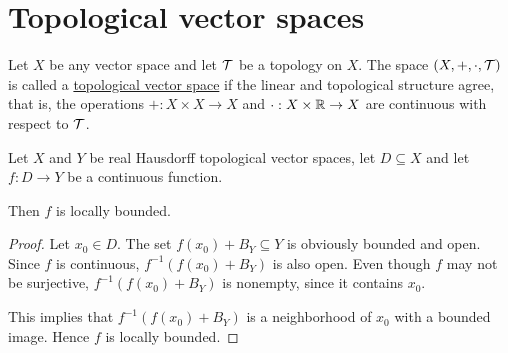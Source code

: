 \section{Topological vector spaces}\label{sec:topological_vector_spaces}

\begin{definition}\label{def:topological_vector_space}
  Let $X$ be any vector space and let $\mathcal T$ be a topology on $X$. The space $(X, +, \cdot, \mathcal T)$ is called a \ul{topological vector space} if the linear and topological structure agree, that is, the operations $+: X \times X \to X$ and $\cdot: X \times \mathbb R \to X$ are continuous with respect to $\mathcal T$.
\end{definition}

\begin{proposition}\label{thm:continuous_implies_locally_bounded}
  Let $X$ and $Y$ be real Hausdorff topological vector spaces, let $D \subseteq X$ and let $f: D \to Y$ be a continuous function.

  Then $f$ is locally bounded.
\end{proposition}
\begin{proof}
  Let $x_0 \in D$. The set $f(x_0) + B_Y \subseteq Y$ is obviously bounded and open. Since $f$ is continuous, $f^{-1}(f(x_0) + B_Y)$ is also open. Even though $f$ may not be surjective, $f^{-1}(f(x_0) + B_Y)$ is nonempty, since it contains $x_0$.

  This implies that $f^{-1}(f(x_0) + B_Y)$ is a neighborhood of $x_0$ with a bounded image. Hence $f$ is locally bounded.
\end{proof}
